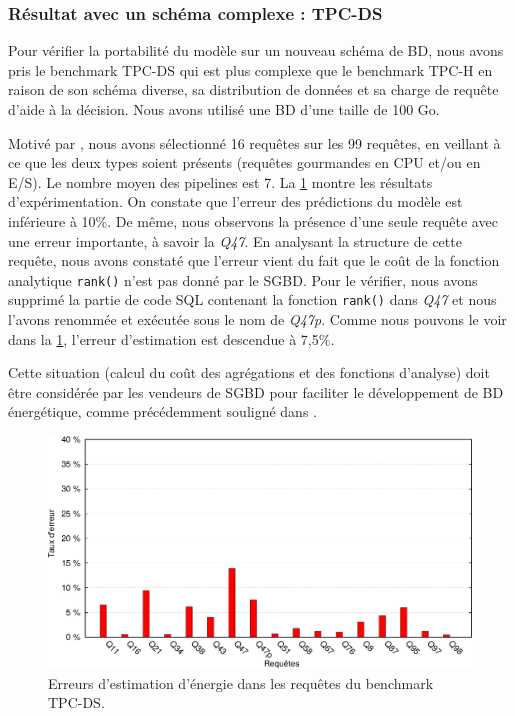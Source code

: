 \subsubsection{Résultat avec un schéma complexe : TPC-DS}
Pour vérifier la portabilité du modèle sur un nouveau schéma de BD, nous avons pris le benchmark TPC-DS qui est plus complexe que le benchmark TPC-H en raison de son schéma diverse, sa distribution de données et sa charge de requête d'aide à la décision. Nous avons utilisé une BD d'une taille de 100 Go.

Motivé par \cite{Poess07}, nous avons sélectionné 16 requêtes sur les 99 requêtes, en veillant à ce que les deux types soient présents (requêtes gourmandes en CPU et/ou en E/S). Le nombre moyen des pipelines est 7. La \ref{fig:tpcds-100-set1-power} montre les résultats d'expérimentation. On constate que l'erreur des prédictions du modèle est inférieure à 10\%. De même, nous observons la présence d'une seule requête avec une erreur importante, à savoir la \textit{Q47}. En analysant la structure de cette requête, nous avons constaté que l'erreur vient du fait que le coût de la fonction analytique \texttt{rank()} n'est pas donné par le SGBD. Pour le vérifier, nous avons supprimé la partie de code SQL contenant la fonction \texttt{rank()} dans \textit{Q47} et nous l'avons renommée et exécutée sous le nom de \textit{Q47p}. Comme nous pouvons le voir dans la \ref{fig:tpcds-100-set1-power}, l'erreur d'estimation est descendue à 7,5\%.

Cette situation (calcul du coût des agrégations et des fonctions d'analyse) doit être considérée par les vendeurs de SGBD pour faciliter le développement de BD énergétique, comme précédemment souligné dans \cite{Harizopoulos09, Graefe08}.

\begin{figure}
 \centering
 \includegraphics[scale=0.5]{chapitre4/chap4Fig/tpcds-100-set1-error.eps}
 \caption{Erreurs d'estimation d'énergie dans les requêtes du benchmark TPC-DS.}
 \label{fig:tpcds-100-set1-power}
\end{figure}

